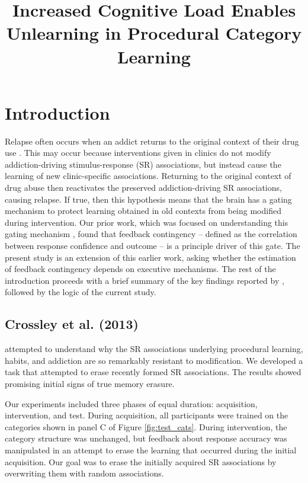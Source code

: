 \documentclass[apacite,draftfirst,man]{apa6}
\title{Increased Cognitive Load Enables Unlearning in Procedural Category Learning}
\begin{document}
\maketitle

\section*{Introduction}
Relapse often occurs when an addict returns to the original context of their
drug use \cite{higgins_outpatient_1995}. This may occur because interventions
given in clinics do not modify addiction-driving stimulus-response (SR)
associations, but instead cause the learning of new clinic-specific
associations. Returning to the original context of drug abuse then reactivates
the preserved addiction-driving SR associations, causing relapse. If true, then
this hypothesis means that the brain has a gating mechanism to protect learning
obtained in old contexts from being modified during intervention. Our prior
work, which was focused on understanding this gating mechanism
\cite{crossley_erasing_2013}, found that feedback contingency -- defined as the
correlation between response confidence and outcome -- is a principle driver of
this gate. The present study is an extension of this earlier work, asking
whether the estimation of feedback contingency depends on executive mechanisms.
The rest of the introduction proceeds with a brief summary of the key findings
reported by \cite{crossley_erasing_2013}, followed by the logic of the current
study.

\subsection*{Crossley et al. (2013)}
 attempted to understand why the SR associations
underlying procedural learning, habits, and addiction are so remarkably
resistant to modification. We developed a task that attempted to erase recently
formed SR associations. The results showed promising initial signs of true
memory erasure.

Our experiments included three phases of equal duration: acquisition,
intervention, and test. During acquisition, all participants were trained on the
categories shown in panel C of Figure \ref{fig:test_cats}. During intervention,
the category structure was unchanged, but feedback about response accuracy was
manipulated in an attempt to erase the learning that occurred during the initial
acquisition. Our goal was to erase the initially acquired SR associations by
overwriting them with random associations.
\end{document}
